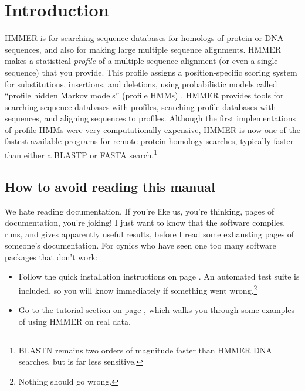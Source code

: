 \section{Introduction}
\setcounter{footnote}{0}

HMMER is for searching sequence databases for homologs of protein or
DNA sequences, and also for making large multiple sequence alignments.
HMMER makes a statistical \emph{profile} of a multiple sequence
alignment (or even a single sequence) that you provide. This profile
assigns a position-specific scoring system for substitutions,
insertions, and deletions, using probabilistic models called ``profile
hidden Markov models'' (profile HMMs) \citep{Krogh94,Eddy98,Durbin98}.
HMMER provides tools for searching sequence databases with profiles,
searching profile databases with sequences, and aligning sequences to
profiles. Although the first implementations of profile HMMs were very
computationally expensive, HMMER is now one of the fastest available
programs for remote protein homology searches, typically faster than
either a BLASTP or FASTA search\citep{Eddy11}.\footnote{BLASTN remains
  two orders of magnitude faster than HMMER DNA searches, but is far
  less sensitive.}

\subsection{How to avoid reading this manual}

We hate reading documentation. If you're like us, you're thinking,
\pageref*{manualend} pages of documentation, you're joking! I just
want to know that the software compiles, runs, and gives apparently
useful results, before I read some \pageref*{manualend} exhausting
pages of someone's documentation. For cynics who have seen one too
many software packages that don't work:

\begin{itemize}

\item Follow the quick installation instructions on page
  \pageref{section:installation}. An automated test suite is included,
  so you will know immediately if something went
  wrong.\footnote{Nothing should go wrong.}

\item Go to the tutorial section on page \pageref{section:tutorial},
  which walks you through some examples of using HMMER on real data.

\end{itemize}

